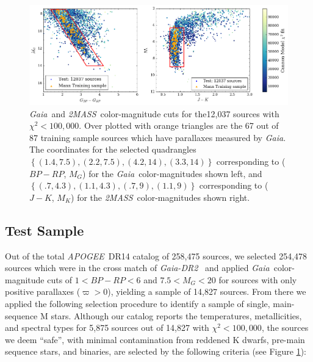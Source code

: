 \documentclass[twocolumn]{aastex62}
\newcommand{\apogee}{\textsl{APOGEE}}
\newcommand{\gaia}{\textsl{Gaia}}
\newcommand{\drtwo}{\textsl{Gaia-DR2}}
\newcommand{\zmass}{\textsl{2MASS}}
\begin{document}
\begin{figure}
	\includegraphics[width=\linewidth]{figures/cmd_selection.png}
	\caption{\gaia\ and \zmass\ color-magnitude cuts for the12,037 sources with $\chi^2<100,000$. Over plotted with orange triangles are the 67 out of 87 training sample sources which have parallaxes measured by \gaia. The coordinates for the selected quadrangles 
	$\left\{ (1.4, 7.5), (2.2, 7.5), (4.2, 14), (3.3, 14) \right\}$ corresponding to ($BP-RP$, $M_G$) for the \gaia\ color-magnitudes shown left, and 
	$\left\{ (.7, 4.3), (1.1, 4.3), (.7, 9), (1.1, 9) \right\}$ corresponding to ($J-K$, $M_K$) for the \zmass\ color-magnitudes shown right. }
	\label{fig:cmd_selection}
\end{figure}


\subsection{Test Sample \label{subsec:test_selection}} 

Out of the total \apogee\ DR14 catalog of 258,475 sources, we selected 254,478 sources which were in the cross match of \drtwo\ \citep{Brown:2018} and applied \gaia\ color-magnitude cuts of $1<BP-RP<6$ and $7.5<M_G<20$ for sources with only positive parallaxes ($\varpi>0$), yielding a sample of 14,827 sources. From there we applied the following selection procedure to identify a sample of single, main-sequence M stars. Although our catalog reports the temperatures, metallicities, and spectral types for 5,875 sources out of 14,827 with $\chi^2<100,000$, the sources we deem ``safe'', with minimal contamination from reddened K dwarfs, pre-main sequence stars, and binaries, are selected by the following criteria (see Figure \ref{fig:cmd_selection}):
\end{document}
